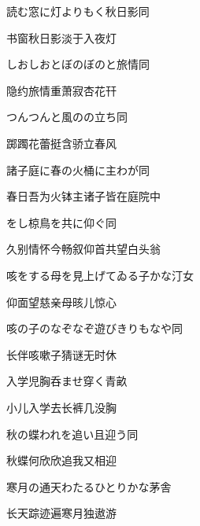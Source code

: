 \begin{haiku}
    {\FH 読む窓に灯よりもく秋日影}\hfill{\FH 同}

    {\FK 书窗秋日影淡于入夜灯}
\end{haiku}

\begin{haiku}
    {\FH しおしおとぼのぼのと旅情}\hfill{\FH 同}

    {\FK 隐约旅情重萧寂杏花幵}
\end{haiku}

\begin{haiku}
    {\FH つんつんと風のの立ち}\hfill{\FH 同}

    {\FK 踯躅花蕾挺含骄立春风}
\end{haiku}

\begin{haiku}
    {\FH 諸子庭に春の火桶に主わが}\hfill{\FH 同}

    {\FK 春日吾为火钵主诸子皆在庭院中}
\end{haiku}

\begin{haiku}
    {\FH {}をし椋鳥を共に仰ぐ}\hfill{\FH 同}

    {\FK 久别情怀今畅叙仰首共望白头翁}
\end{haiku}

\begin{haiku}
    {\FH 咳をする母を見上げてゐる子かな}\hfill{\FH 汀女}

    {\FK 仰面望慈亲母晐儿惊心}
\end{haiku}

\begin{haiku}
    {\FH 咳の子のなぞなぞ遊びきりもなや}\hfill{\FH 同}

    {\FK 长伴咳嗽子猜谜无时休}
\end{haiku}

\begin{haiku}
    {\FH 入学児胸呑ませ穿く}\hfill{\FH 青畝}

    {\FK 小儿入学去长裤几没胸}
\end{haiku}

\begin{haiku}
    {\FH 秋の蝶われを追い且迎う}\hfill{\FH 同}

    {\FK 秋蝶何欣欣追我又相迎}
\end{haiku}

\begin{haiku}
    {\FH 寒月の通天わたるひとりかな}\hfill{\FH 茅舎}

    {\FK 长天踪迹遍寒月独遨游}
\end{haiku}


